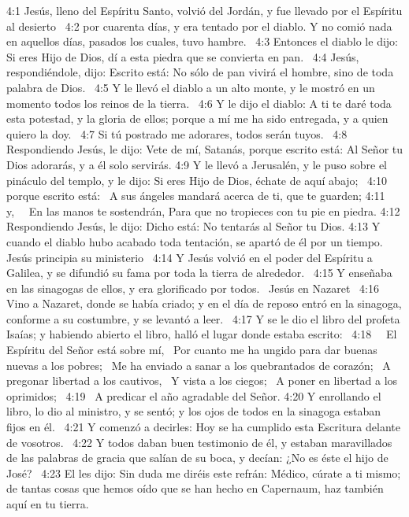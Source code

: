 4:1 Jesús, lleno del Espíritu Santo, volvió del Jordán, y fue llevado por el Espíritu al desierto  
4:2 por cuarenta días, y era tentado por el diablo. Y no comió nada en aquellos días, pasados los cuales, tuvo hambre.  
4:3 Entonces el diablo le dijo: Si eres Hijo de Dios, dí a esta piedra que se convierta en pan.  
4:4 Jesús, respondiéndole, dijo: Escrito está: No sólo de pan vivirá el hombre, sino de toda palabra de Dios.  
4:5 Y le llevó el diablo a un alto monte, y le mostró en un momento todos los reinos de la tierra.  
4:6 Y le dijo el diablo: A ti te daré toda esta potestad, y la gloria de ellos; porque a mí me ha sido entregada, y a quien quiero la doy.  
4:7 Si tú postrado me adorares, todos serán tuyos.  
4:8 Respondiendo Jesús, le dijo: Vete de mí, Satanás, porque escrito está: Al Señor tu Dios adorarás, y a él solo servirás. 
4:9 Y le llevó a Jerusalén, y le puso sobre el pináculo del templo, y le dijo: Si eres Hijo de Dios, échate de aquí abajo;  
4:10 porque escrito está:  
A sus ángeles mandará acerca de ti, que te guarden; 
4:11   y,   En las manos te sostendrán, Para que no tropieces con tu pie en piedra. 
4:12 Respondiendo Jesús, le dijo: Dicho está: No tentarás al Señor tu Dios. 
4:13 Y cuando el diablo hubo acabado toda tentación, se apartó de él por un tiempo.  
Jesús principia su ministerio   
4:14 Y Jesús volvió en el poder del Espíritu a Galilea, y se difundió su fama por toda la tierra de alrededor.  
4:15 Y enseñaba en las sinagogas de ellos, y era glorificado por todos.  
Jesús en Nazaret   
4:16 Vino a Nazaret, donde se había criado; y en el día de reposo entró en la sinagoga, conforme a su costumbre, y se levantó a leer.  
4:17 Y se le dio el libro del profeta Isaías; y habiendo abierto el libro, halló el lugar donde estaba escrito:  
4:18   El Espíritu del Señor está sobre mí,  
Por cuanto me ha ungido para dar buenas nuevas a los pobres;  
Me ha enviado a sanar a los quebrantados de corazón;  
A pregonar libertad a los cautivos,  
Y vista a los ciegos;  
A poner en libertad a los oprimidos;  
4:19  A predicar el año agradable del Señor. 
4:20 Y enrollando el libro, lo dio al ministro, y se sentó; y los ojos de todos en la sinagoga estaban fijos en él.  
4:21 Y comenzó a decirles: Hoy se ha cumplido esta Escritura delante de vosotros.  
4:22 Y todos daban buen testimonio de él, y estaban maravillados de las palabras de gracia que salían de su boca, y decían: ¿No es éste el hijo de José?  
4:23 El les dijo: Sin duda me diréis este refrán: Médico, cúrate a ti mismo; de tantas cosas que hemos oído que se han hecho en Capernaum, haz también aquí en tu tierra.  
